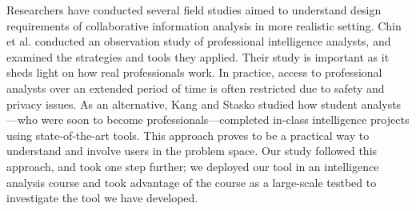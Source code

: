 Researchers have conducted several field studies aimed to understand design requirements of collaborative information analysis in more realistic setting. Chin et al. \cite{Chin2009} conducted an observation study of professional intelligence analysts, and examined the strategies and tools they applied. Their study is important as it sheds light on how real professionals work. In practice, access to professional analysts over an extended period of time is often restricted due to safety and privacy issues. As an alternative, Kang and Stasko \cite{Kang2011} studied how student analysts---who were soon to become professionals---completed in-class intelligence projects using state-of-the-art tools. This approach proves to be a practical way to understand and involve users in the problem space. Our study followed this approach, and took one step further; we deployed our tool in an intelligence analysis course and took advantage of the course as a large-scale testbed to investigate the tool we have developed. 





